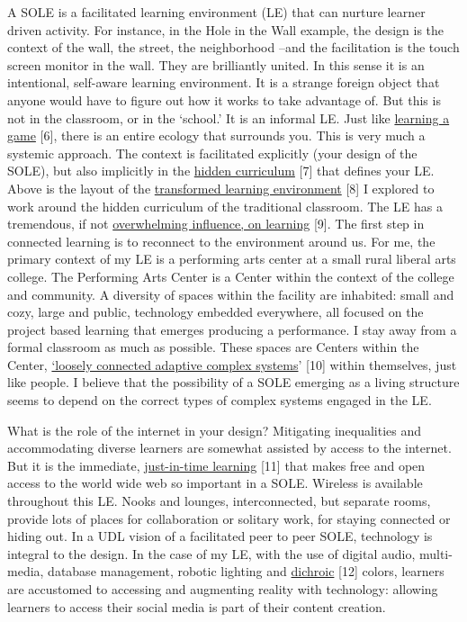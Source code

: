 A SOLE is a
facilitated learning environment (LE) that can nurture learner driven
activity. For instance, in the Hole in the Wall example, the design is
the context of the wall, the street, the neighborhood --and the
facilitation is the touch screen monitor in the wall. They are
brilliantly united. In this sense it is an intentional, self-aware
learning environment. It is a strange foreign object that anyone would
have to figure out how it works to take advantage of. But this is not in
the classroom, or in the `school.' It is an informal LE. Just
like
\href{http://www.academia.edu/1137269/Game-based\_Learning\_and\_Intrinsic\_Motivation}{learning
a game} {[}6{]}, there is an entire ecology that surrounds you. This is
very much a systemic approach. The context is facilitated explicitly
(your design of the SOLE), but also implicitly in the
\href{http://en.wikipedia.org/wiki/Hidden\_curriculum}{hidden
curriculum} {[}7{]} that defines your LE. Above is the layout of the
\href{http://www.scribd.com/doc/181089012/Transformed-Learning-Environment-Analysis}{transformed
learning environment} {[}8{]} I explored to work around the hidden
curriculum of the traditional classroom. The LE has a tremendous, if not
\href{http://scholar.lib.vt.edu/theses/available/etd-09232007-220306/unrestricted/SElmasryETDbodytext.pdf}{overwhelming
influence, on learning} {[}9{]}. The first step in connected learning is
to reconnect to the environment around us. For me, the primary context
of my LE is a performing arts center at a small rural liberal arts
college. The Performing Arts Center is a Center within the context of
the college and community. A diversity of spaces within the facility are
inhabited: small and cozy, large and public, technology embedded
everywhere, all focused on the project based learning that emerges
producing a performance. I stay away from a formal classroom as much as
possible. These spaces are Centers within the Center,
\href{http://nourdiab.wordpress.com/2011/02/23/the-theories-of-christopher-alexander/}{`loosely
connected adaptive complex systems}' {[}10{]} within themselves, just
like people. I believe that the possibility of a SOLE emerging as a
living structure seems to depend on the correct types of complex systems
engaged in the LE.

What is the role of the internet in your design? Mitigating inequalities
and accommodating diverse learners are somewhat assisted by access to
the internet. But it is the immediate,
\href{http://www.wordstream.com/blog/ws/2013/10/02/just-in-time-information-hacks}{just-in-time
learning} {[}11{]} that makes free and open access to the world wide web
so important in a SOLE. Wireless is available throughout this LE. Nooks
and lounges, interconnected, but separate rooms, provide lots of places
for collaboration or solitary work, for staying connected or hiding out.
In a UDL vision of a facilitated peer to peer SOLE, technology is
integral to the design. In the case of my LE, with the use of digital
audio, multi-media, database management, robotic lighting and
\href{http://en.wikipedia.org/wiki/Dichroic\_filter}{dichroic} {[}12{]}
colors, learners are accustomed to accessing and augmenting reality with
technology: allowing learners to access their social media is part of
their content creation.


